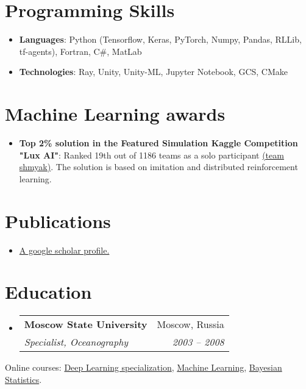 \documentclass[letterpaper,12pt]{article}
\makeatletter
\newcommand{\resumeItem}[2]{
  \item\small{
    \textbf{#1}{: #2 \vspace{-2pt}}
  }
}
\newcommand{\resumePubItem}[2]{
  \item\small{
    \textbf{#1}{ #2 \vspace{-2pt}}
  }
}
\newcommand{\resumeSubheading}[4]{
  \vspace{-1pt}\item
    \begin{tabular*}{0.97\textwidth}[t]{l@{\extracolsep{\fill}}r}
      \textbf{#1} & #2 \\
      \textit{\small#3} & \textit{\small #4} \\
    \end{tabular*}\vspace{+1pt}
}
\newcommand{\resumeSubHeadingListStart}{\begin{itemize}[leftmargin=*]}
\newcommand{\resumeSubHeadingListEnd}{\end{itemize}}
\makeatother
\begin{document}
\section{Programming Skills}
\resumeSubHeadingListStart
\item{
	\textbf{Languages}{: Python (Tensorflow, Keras, PyTorch, Numpy, Pandas, RLLib, tf-agents), Fortran, C\#, MatLab}
}
\item{	
	\textbf{Technologies}{: Ray, Unity, Unity-ML, Jupyter Notebook, GCS, CMake}
}
\resumeSubHeadingListEnd

\section{Machine Learning awards}
\resumeSubHeadingListStart

\resumeItem{Top 2\% solution in the Featured Simulation Kaggle Competition "Lux AI"}
{Ranked 19th out of 1186 teams as a solo participant \href{https://www.kaggle.com/c/lux-ai-2021/leaderboard}{(team shmyak)}.
	The solution is based on imitation and distributed reinforcement learning.
}

\resumeSubHeadingListEnd

\section{Publications}
  \resumeSubHeadingListStart
    \resumePubItem{}
      {\href{https://scholar.google.com/citations?hl=en&user=72diaAiPvoYC&view_op=list_works&sortby=pubdate}{A google scholar profile.}}
  \resumeSubHeadingListEnd

\section{Education}
  \resumeSubHeadingListStart
    \resumeSubheading
      {Moscow State University}{Moscow, Russia}
      {Specialist, Oceanography}{2003 -- 2008}
  \resumeSubHeadingListEnd
  
  Online courses:
  {\href{https://coursera.org/share/738f07c3514e74b4b4a2ec4c7df53d11}{Deep Learning specialization},
   \href{https://coursera.org/share/a7e216966ca1e16fd6c58b7d58cb0806}{Machine Learning},
   \href{https://coursera.org/share/2a20ba63d42f5a2557db34e3e9837382}{Bayesian Statistics}.}

\end{document}
